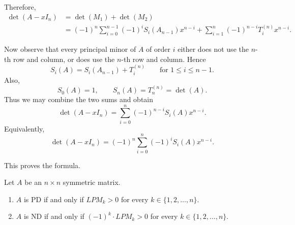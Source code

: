 \begin{pfbox}
Therefore,
\begin{align*}
\det(A-xI_n)
&=
\det(M_1)+\det(M_2) \\
&=
(-1)^n
\sum_{i=0}^{n-1}
(-1)^i S_i(A_{n-1})x^{n-i}
+
\sum_{i=1}^n
(-1)^{n-i}T_i^{(n)}x^{n-i}.
\end{align*}

Now observe that every principal minor of $A$ of order $i$ either does not use
the $n$-th row and column, or does use the $n$-th row and column. Hence
\[
S_i(A)=S_i(A_{n-1})+T_i^{(n)}
\qquad
\text{for } 1\le i\le n-1.
\]
Also,
\[
S_0(A)=1,
\qquad
S_n(A)=T_n^{(n)}=\det(A).
\]
Thus we may combine the two sums and obtain
\[
\det(A-xI_n)
=
\sum_{i=0}^n
(-1)^{n-i}S_i(A)x^{n-i}.
\]
Equivalently,
\[
\det(A-xI_n)
=
(-1)^n
\sum_{i=0}^n
(-1)^i S_i(A)x^{n-i}.
\]

This proves the formula.
\end{pfbox}



\begin{theorem}
	Let $A$ be an $n \times n$ symmetric matrix.
	\begin{enumerate}
		\item $A$ is PD if and only if $LPM_k > 0$ for every $k \in \{1, 2, \dots, n\}$.
		\item $A$ is ND if and only if $(-1)^k \cdot LPM_k > 0$ for every $k \in \{1, 2, \dots, n\}$.
	\end{enumerate}
\label{Syl. criterion I}
\end{theorem}

